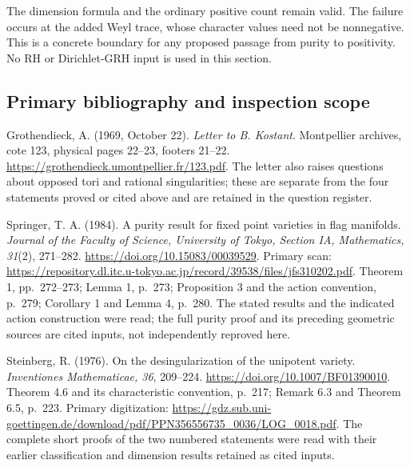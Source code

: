 The dimension formula and the ordinary positive count remain
valid. The failure occurs at the added Weyl trace, whose
character values need not be nonnegative. This is a concrete
boundary for any proposed passage from purity to positivity.
No RH or Dirichlet-GRH input is used in this section.

\subsection{Primary bibliography and inspection scope}
Grothendieck, A. (1969, October 22). \emph{Letter to B. Kostant}.
Montpellier archives, cote 123, physical pages 22--23,
footers 21--22. \url{https://grothendieck.umontpellier.fr/123.pdf}.
The letter also raises questions about opposed tori and rational
singularities; these are separate from the four statements proved
or cited above and are retained in the question register.

Springer, T. A. (1984). A purity result for fixed point varieties
in flag manifolds. \emph{Journal of the Faculty of Science,
University of Tokyo, Section IA, Mathematics, 31}(2), 271--282.
\url{https://doi.org/10.15083/00039529}.
Primary scan: \url{https://repository.dl.itc.u-tokyo.ac.jp/record/39538/files/jfs310202.pdf}.
Theorem 1, pp.~272--273; Lemma 1, p.~273; Proposition 3 and
the action convention, p.~279; Corollary 1 and Lemma 4, p.~280.
The stated results and the indicated action construction were read;
the full purity proof and its preceding geometric sources are
cited inputs, not independently reproved here.

Steinberg, R. (1976). On the desingularization of the unipotent
variety. \emph{Inventiones Mathematicae, 36}, 209--224.
\url{https://doi.org/10.1007/BF01390010}.
Theorem 4.6 and its characteristic convention, p.~217;
Remark 6.3 and Theorem 6.5, p.~223. Primary digitization:
\url{https://gdz.sub.uni-goettingen.de/download/pdf/PPN356556735_0036/LOG_0018.pdf}.
The complete short proofs of the two numbered statements were
read with their earlier classification and dimension results
retained as cited inputs.
